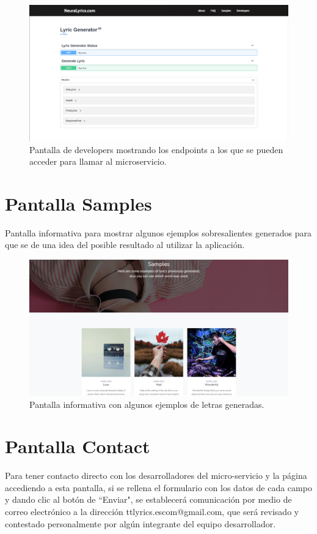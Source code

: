 \documentclass[12pt, a4paper, titlepage]{article}
\begin{document}
		\begin{figure}[H] 
			\includegraphics[width=13.5cm]{./Imagenes/Capturas/pdev.png}
			\centering \caption{Pantalla de developers mostrando los endpoints a los que se pueden acceder para llamar al microservicio.}
		\end{figure}
		
		\section{Pantalla Samples}
		Pantalla informativa para mostrar algunos ejemplos sobresalientes generados para que se de una idea del posible resultado al utilizar la aplicación.
		
		\begin{figure}[H] 
			\includegraphics[width=13.5cm]{./Imagenes/Capturas/psamples.png}
			\centering \caption{Pantalla informativa con algunos ejemplos de letras generadas.}
		\end{figure}
	
		\section{Pantalla Contact}
		Para tener contacto directo con los desarrolladores del micro-servicio y la página accediendo a esta pantalla, si se rellena el formulario con los datos de cada campo y dando clic al botón de “Enviar", se establecerá comunicación por medio de correo electrónico a la dirección ttlyrics.escom@gmail.com, que será revisado y contestado personalmente por algún integrante del equipo desarrollador.
		
\end{document}
